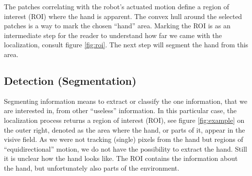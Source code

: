 \documentclass[conference]{IEEEtran}
\begin{document}
%
The patches correlating with the robot's actuated motion define a region of interest (ROI) where the hand is apparent. The convex hull around the selected patches is a way to mark the chosen ``hand'' area. Marking the ROI is as an intermediate step for the reader to understand how far we came with the localization, consult figure \ref{fig:roi}. The next step will segment the hand from this area.
%
%
%
%
\subsection{Detection (Segmentation)}\label{method:detection}
Segmenting information means to extract or classify the one information, that we are interested in, from other ``useless'' information. In this particular case, the localization process returns a region of interest (ROI), see figure \ref{fig:example} on the outer right, denoted as the area where the hand, or parts of it, appear in the visive field. As we were not tracking (single) pixels from the hand but regions of ``equidirectional'' motion, we do not have the possibility to extract the hand. Still it is unclear how the hand looks like. The ROI contains the information about the hand, but unfortunately also parts of the environment.
\end{document}
